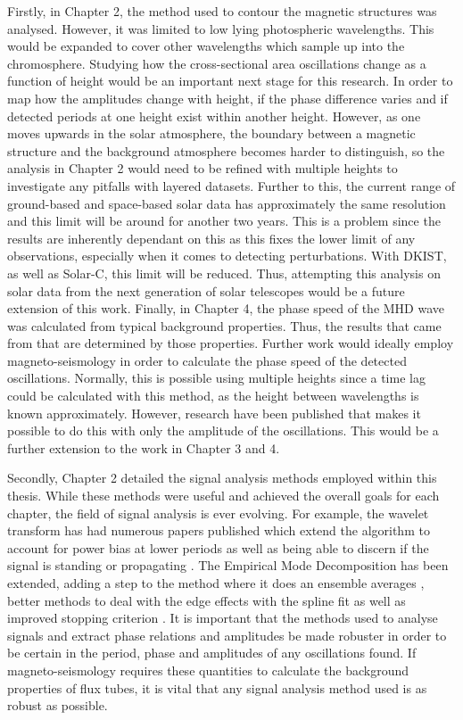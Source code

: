     Firstly, in Chapter 2, the method used to contour the magnetic structures was analysed.
    However, it was limited to low lying photospheric wavelengths.
    This would be expanded to cover other wavelengths which sample up into the chromosphere. 
    Studying how the cross-sectional area oscillations change as a function of height would be an important next stage for this research.
    In order to map how the amplitudes change with height, if the phase difference varies and if detected periods at one height exist within another height.
    However, as one moves upwards in the solar atmosphere, the boundary between a magnetic structure and the background atmosphere becomes harder to distinguish, so the analysis in Chapter 2 would need to be refined with multiple heights to investigate any pitfalls with layered datasets.
    Further to this, the current range of ground-based and space-based solar data has approximately the same resolution and this limit will be around for another two years. 
    This is a problem since the results are inherently dependant on this as this fixes the lower limit of any observations, especially when it comes to detecting perturbations.
    With DKIST, as well as Solar-C, this limit will be reduced.
    Thus, attempting this analysis on solar data from the next generation of solar telescopes would be a future extension of this work. 
    Finally, in Chapter 4, the phase speed of the MHD wave was calculated from typical background properties.
    Thus, the results that came from that are determined by those properties. 
    Further work would ideally employ magneto-seismology in order to calculate the phase speed of the detected oscillations. 
    Normally, this is possible using multiple heights since a time lag could be calculated with this method, as the height between wavelengths is known approximately.
    However, research \citep{2015A&A...579A..73M} have been published that makes it possible to do this with only the amplitude of the oscillations.
    This would be a further extension to the work in Chapter 3 and 4.
    
    Secondly, Chapter 2 detailed the signal analysis methods employed within this thesis.
    While these methods were useful and achieved the overall goals for each chapter, the field of signal analysis is ever evolving.
    For example, the wavelet transform has had numerous papers published which extend the algorithm to account for power bias at lower periods \citep{liu2007rectification,veleda2012cross} as well as being able to discern if the signal is standing or propagating \citep{2008SoPh..248..395S}.
    The Empirical Mode Decomposition has been extended, adding a step to the method where it does an ensemble averages \citep{wu2009ensemble}, better methods to deal with the edge effects with the spline fit \citep{zeng2004simple} as well as improved stopping criterion \citep{huang2008review}.
    It is important that the methods used to analyse signals and extract phase relations and amplitudes be made robuster in order to be certain in the period, phase and amplitudes of any oscillations found.
    If magneto-seismology requires these quantities to calculate the background properties of flux tubes, it is vital that any signal analysis method used is as robust as possible. 
    
